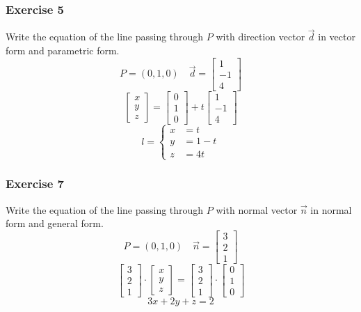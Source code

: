 \documentclass[letterpaper, 12pt]{math}
\begin{document}
\subsubsection*{Exercise 5}
Write the equation of the line passing through \( P \) with direction vector
\( \vec{d} \) in vector form and parametric form.
\[ P = (0,1,0) \quad \vec{d} = \begin{bmatrix}1 \\ -1 \\ 4\end{bmatrix} \]
\[ \begin{bmatrix}x \\ y \\ z\end{bmatrix} =
  \begin{bmatrix}0 \\ 1 \\ 0\end{bmatrix}+
  t\begin{bmatrix}1 \\ -1 \\ 4\end{bmatrix} \]
\[ l = \begin{cases}
  x &= t \\
  y &= 1-t \\
  z &= 4t
\end{cases} \]

\subsubsection*{Exercise 7}
Write the equation of the line passing through \( P \) with normal vector
\( \vec{n} \) in normal form and general form.
\[ P = (0,1,0) \quad \vec{n} = \begin{bmatrix}3 \\ 2 \\ 1\end{bmatrix} \]
\[ \begin{bmatrix}3 \\ 2 \\ 1\end{bmatrix}\cdot
  \begin{bmatrix}x \\ y \\ z\end{bmatrix} =
  \begin{bmatrix}3 \\ 2 \\ 1\end{bmatrix}\cdot
  \begin{bmatrix}0 \\ 1 \\ 0\end{bmatrix} \]
\[ 3x+2y+z = 2 \]
\end{document}
